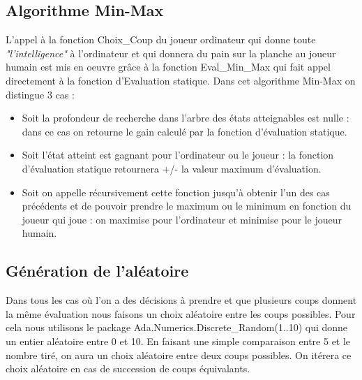 \documentclass[a4paper, 10pt, french]{article}
\begin{document}
{    \subsection{Algorithme Min-Max}
    {
    L'appel à la fonction Choix\_Coup du joueur ordinateur qui donne toute {\em "l'intelligence"} à l'ordinateur et qui donnera du pain sur la planche au joueur humain est mis en oeuvre grâce à la fonction Eval\_Min\_Max qui fait appel directement à la fonction d'Evaluation statique.
    Dans cet algorithme Min-Max on distingue 3 cas :
    \begin{itemize}
            \item Soit la profondeur de recherche dans l'arbre des états atteignables est nulle : dans ce cas on retourne le gain calculé par la fonction d'évaluation statique. 
            \item Soit l'état atteint est gagnant pour l'ordinateur ou le joueur : la fonction d'évaluation statique retournera +/- la valeur maximum d'évaluation.
            \item Soit on appelle récursivement cette fonction jusqu'à obtenir l'un des cas précédents et de pouvoir prendre le maximum ou le minimum en fonction du joueur qui joue : on maximise pour l'ordinateur et minimise pour le joueur humain.
        \end{itemize}
    }

    \subsection{Génération de l'aléatoire}
    {
    Dans tous les cas où l'on a des décisions à prendre et que plusieurs coups donnent la même évaluation nous faisons un choix aléatoire entre les coups possibles.
    Pour cela nous utilisons le package Ada.Numerics.Discrete\_Random(1..10) qui donne un entier aléatoire entre 0 et 10. En faisant une simple comparaison entre 5 et le nombre tiré, on aura un choix aléatoire entre deux coups possibles. On itérera ce choix aléatoire en cas de succession de coups équivalants. 
    }
}   
\end{document}
